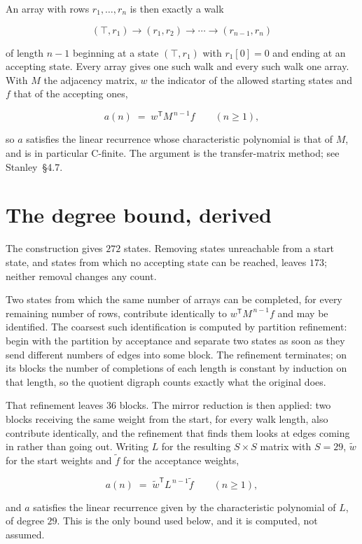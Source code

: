 \documentclass[11pt]{article}
\theoremstyle{definition}
\begin{document}
An array with rows $r_1,\dots,r_n$ is then exactly a walk

\[(\top,r_1) \to (r_1,r_2) \to \cdots \to (r_{n-1},r_n)\]

of length $n-1$ beginning at a state $(\top,r_1)$ with $r_1[0]=0$ and ending at an accepting state. Every array gives one such walk and every such walk one array. With $M$ the adjacency matrix, $w$ the indicator of the allowed starting states and $f$ that of the accepting ones,

\[a(n) \;=\; w^{\mathsf T} M^{\,n-1} f \qquad (n \ge 1),\]

so $a$ satisfies the linear recurrence whose characteristic polynomial is that of $M$, and is in particular C-finite. The argument is the transfer-matrix method; see Stanley~\S4.7.

\section{The degree bound, derived}

The construction gives $272$ states. Removing states unreachable from a start state, and states from which no accepting state can be reached, leaves $173$; neither removal changes any count.

Two states from which the same number of arrays can be completed, for every remaining number of rows, contribute identically to $w^{\mathsf T}M^{\,n-1}f$ and may be identified. The coarsest such identification is computed by partition refinement: begin with the partition by acceptance and separate two states as soon as they send different numbers of edges into some block. The refinement terminates; on its blocks the number of completions of each length is constant by induction on that length, so the quotient digraph counts exactly what the original does.

That refinement leaves $36$ blocks. The mirror reduction is then applied: two blocks receiving the same weight from the start, for every walk length, also contribute identically, and the refinement that finds them looks at edges coming in rather than going out. Writing $L$ for the resulting $S \times S$ matrix with $S = 29$, $\tilde w$ for the start weights and $\tilde f$ for the acceptance weights,

\[a(n) \;=\; \tilde w^{\mathsf T} L^{\,n-1} \tilde f \qquad (n \ge 1),\]

and $a$ satisfies the linear recurrence given by the characteristic polynomial of $L$, of degree $29$. This is the only bound used below, and it is computed, not assumed.
\end{document}
